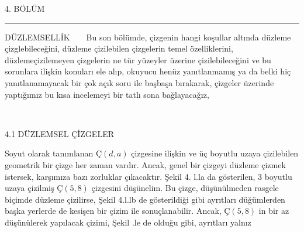 \documentclass[11pt]{amsbook}
\begin{document}
\huge
4. BÖLÜM
\newline
\noindent\rule[0.5ex]{\linewidth}{1pt}
DÜZLEMSELLİK
~\newline
\LARGE
~\newline
Bu son bölümde, çizgenin hangi koşullar altında
\newline
düzleme çizglebileceğini, düzleme çizilebilen
\newline
çizgelerin temel özelliklerini, düzlemeçizilemeyen
\newline
çizgelerin ne tür yüzeyler üzerine çizilebileceğini
\newline
ve bu sorunlara ilişkin konuları ele alıp,
\newline
okuyucu henüz yanıtlanmamış ya da belki hiç
\newline
yanıtlanamayacak bir çok açık soru ile başbaşa
\newline
bırakarak, çizgeler üzerinde yaptığımız bu kısa
\newline
incelemeyi bir tatlı sona bağlayacağız,

~\newline

4.1 DÜZLEMSEL ÇİZGELER
~\newline

Soyut olarak tanımlanan $Ç(d,a)$ çizgesine ilişkin
\newline
ve üç boyutlu uzaya çizilebilen geometrik bir
\newline
çizge her zaman vardır. Ancak, genel bir çizgeyi
\newline
düzleme çizmek istersek, karşımıza bazı zorluklar
\newline
çıkacaktır. Şekil 4. l.la da gösterilen, 3 boyutlu
\newline
uzaya çizilmiş $Ç(5,8)$ çizgesini düşünelim. Bu
\newline
çizge, düşünülmeden rasgele biçimde düzleme
\newline
çizilirse, Şekil 4.l.lb de gösterildiği gibi
\newline
ayrıtları düğümlerden başka yerlerde de kesişen
\newline
bir çizim ile sonuçlanabilir. Ancak, $Ç(5,8)$ in
\newline
bir az düşünülerek yapılacak çizimi, Şekil
 .le de olduğu gibi, ayrıtları yalnız
\end{document}
